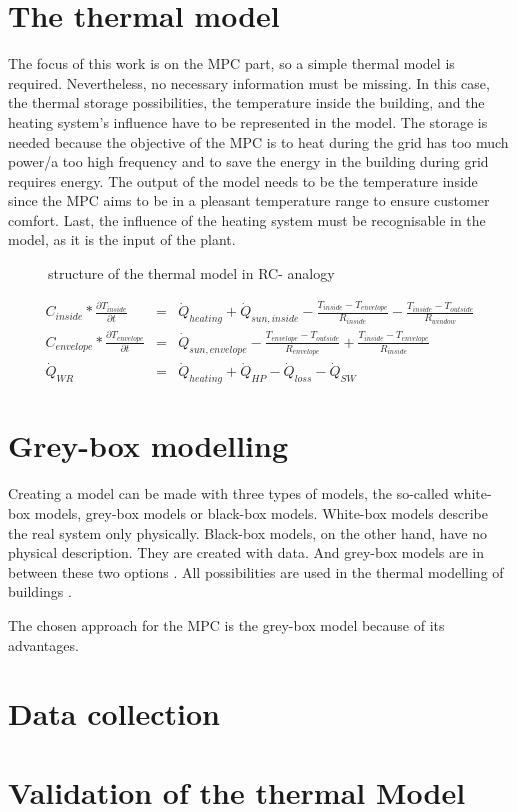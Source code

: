 \section{The thermal model}
\label{thermalmodel}

    The focus of this work is on the MPC part, so a simple thermal model is required. Nevertheless, no necessary information must be missing. In this case, the thermal storage possibilities, the temperature inside the building, and the heating system's influence have to be represented in the model. The storage is needed because the objective of the MPC is to heat during the grid has too much power/a too high frequency and to save the energy in the building during grid requires energy. The output of the model needs to be the temperature inside since the MPC aims to be in a pleasant temperature range to ensure customer comfort. Last, the influence of the heating system must be recognisable in the model, as it is the input of the plant. 
    \newline
    \begin{figure}
        \centering
        \def\svgwidth{320pt}
        
        \caption{structure of the thermal model in RC- analogy}
        \label{fig:structureThermalModel}
    \end{figure}
    \begin{align}
       \label{eq:meinModel} 
       C_{inside}*\frac{\partial T_{inside}}{\partial t} &=& \dot{Q}_{heating} + \dot{Q}_{sun,inside} - \frac{T_{inside}-T_{envelope}}{R_{inside}} - \frac{T_{inside}-T_{outside}}{R_{window}}\\
       C_{envelope}*\frac{\partial T_{envelope}}{\partial t} &=& \dot{Q}_{sun,envelope} - \frac{T_{envelope}-T_{outside}}{R_{envelope}} + \frac{T_{inside}-T_{envelope}}{R_{inside}} \nonumber \\
       \dot{Q}_{WR}&=& \dot{Q}_{heating} + \dot{Q}_{HP} - \dot{Q}_{loss} - \dot{Q}_{SW} \nonumber
    \end{align}

\section{Grey-box modelling}
\label{Grey-box modelling}

Creating a model can be made with three types of models, the so-called white-box models, grey-box models or black-box models. White-box models describe the real system only physically. Black-box models, on the other hand, have no physical description. They are created with data. And grey-box models are in between these two options \cite{Statusseminar.ForschungfurEnergieoptimiertesBauen.2009}. All possibilities are used in the thermal modelling of buildings \cite{Kramer.2012}.

The chosen approach for the MPC is the grey-box model because of its advantages.    

\section{Data collection}
\label{datacollection}

\section{Validation of the thermal Model}
\label{validationthermalmodel}



